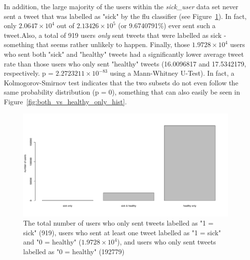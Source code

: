 \documentclass[11pt, a4paper]{article}\usepackage[]{graphicx}\usepackage[]{color}
\begin{document}
In addition, the large majority of the users within the \textit{sick\_user} data set never sent a tweet that was labelled as "sick" by the flu classifier (see Figure~\ref{fig:barplot_sick_df}). In fact, only \ensuremath{2.0647\times 10^{4}} out of \ensuremath{2.13426\times 10^{5}} (or 9.6740791\%) ever sent such a tweet.\newline Also, a total of 919 users \textit{only} sent tweets that were labelled as sick - something that seems rather unlikely to happen. Finally, those \ensuremath{1.9728\times 10^{4}} users who sent both "sick" and "healthy" tweets had a significantly lower average tweet rate than those users who only sent "healthy" tweets (16.0096817 and 17.5342179, respectively. p = \ensuremath{2.2723211\times 10^{-83}} using a Mann-Whitney U-Test). In fact, a Kolmogorov-Smirnov test indicates that the two subsets do not even follow the same probability distribution (p = 0), something that can also easily be seen in Figure~\ref{fig:both_vs_healthy_only_hist}.

\begin{figure}[h]
\centering
\includegraphics[width=1\linewidth]{barplot_sick_raw_df.pdf}
\caption{The total number of users who only sent tweets labelled as "1 = sick" (919), users who sent at least one tweet labelled as "1 = sick" and "0 = healthy" (\ensuremath{1.9728\times 10^{4}}), and users who only sent tweets labelled as "0 = healthy" (192779)}
\label{fig:barplot_sick_df}
\end{figure}
\end{document}
